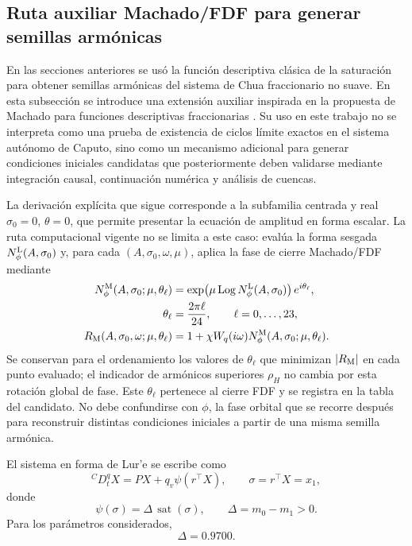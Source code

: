 \documentclass[journal]{IEEEtran}
\begin{document}
\subsection{Ruta auxiliar Machado/FDF para generar semillas armónicas}
\label{subsec:machado_seed_chua_ns}

En las secciones anteriores se usó la función descriptiva clásica de la
saturación para obtener semillas armónicas del sistema de Chua fraccionario no
suave. En esta subsección se introduce una extensión auxiliar inspirada en la
propuesta de Machado para funciones descriptivas fraccionarias
\cite{Machado2015FDF}. Su uso en este trabajo no se interpreta como una
prueba de existencia de ciclos límite exactos en el sistema autónomo de Caputo,
sino como un mecanismo adicional para generar condiciones iniciales candidatas
que posteriormente deben validarse mediante integración causal, continuación
numérica y análisis de cuencas.

La derivación explícita que sigue corresponde a la subfamilia centrada y real
\(\sigma_0=0\), \(\theta=0\), que permite presentar la ecuación de amplitud
en forma escalar. La ruta computacional vigente no se limita a este caso:
evalúa la forma sesgada \(N_{\phi}^{\rm L}(A,\sigma_0)\) y, para cada
\((A,\sigma_0,\omega,\mu)\), aplica la fase de cierre Machado/FDF mediante
\begin{equation}
\label{eq:machado_operational_closure_ns}
\begin{aligned}
N_{\phi}^{\rm M}(A,\sigma_0;\mu,\theta_\ell)
&=\exp\!\left(\mu\operatorname{Log}
N_{\phi}^{\rm L}(A,\sigma_0)\right)e^{i\theta_\ell},\\
\theta_\ell&=\frac{2\pi\ell}{24},\qquad \ell=0,\ldots,23,\\
R_{\rm M}(A,\sigma_0,\omega;\mu,\theta_\ell)
&=1+\chi W_q(i\omega)N_{\phi}^{\rm M}(A,\sigma_0;\mu,\theta_\ell).
\end{aligned}
\end{equation}
Se conservan para el ordenamiento los valores de \(\theta_\ell\) que
minimizan \(\lvert R_{\rm M}\rvert\) en cada punto evaluado; el indicador de
armónicos superiores \(\rho_H\) no cambia por esta rotación global de fase.
Este \(\theta_\ell\) pertenece al cierre FDF y se registra en la tabla del
candidato. No debe confundirse con \(\phi\), la fase orbital que se recorre
después para reconstruir distintas condiciones iniciales a partir de una
misma semilla armónica.

El sistema en forma de Lur'e se escribe como
\begin{equation}
\label{eq:lure_ns_machado}
{}^{C}D_t^qX
=
PX+q_v\psi(r^\top X),
\qquad
\sigma=r^\top X=x_1,
\end{equation}
donde
\begin{equation}
\label{eq:psi_ns_machado}
\psi(\sigma)
=
\Delta\,\operatorname{sat}(\sigma),
\qquad
\Delta=m_0-m_1>0.
\end{equation}
Para los parámetros considerados,
\begin{equation}
\Delta=0.9700.
\end{equation}
\end{document}
